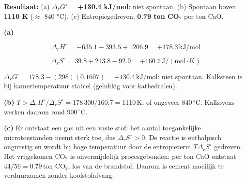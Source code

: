 \begin{oplossing}
\textbf{Resultaat:} (a) \(\Delta_r G^\circ\) = \textbf{+130.4 kJ/mol}: niet spontaan. (b) Spontaan boven \textbf{1110 K} (\ensuremath{\approx{}} 840 °C). (c) Entropiegedreven; \textbf{0.79 ton CO\ensuremath{_{2}}} per ton CaO.

\textbf{(a)}

\[
\Delta_r H^\circ = -635.1 - 393.5 + 1206.9 = +178.3\,\mathrm{kJ/mol}
\]

\[
\Delta_r S^\circ = 39.8 + 213.8 - 92.9 = +160.7\,\mathrm{J/(mol\cdot K)}
\]

\(\Delta_r G^\circ = 178.3 - (298)(0.1607) = +130.4\,\mathrm{kJ/mol}\): niet spontaan. Kalksteen is bij kamertemperatuur stabiel (gelukkig voor kathedralen).

\textbf{(b)} \(T > \Delta_r H^\circ/\Delta_r S^\circ = 178\,300/160.7 = 1110\,\mathrm{K}\), of ongeveer \(840\,^\circ\mathrm{C}\). Kalkovens werken daarom rond \(900\,^\circ\mathrm{C}\).

\textbf{(c)} Er ontstaat een gas uit een vaste stof: het aantal toegankelijke microtoestanden neemt sterk toe, dus \(\Delta_r S^\circ > 0\). De reactie is enthalpisch ongunstig en wordt bij hoge temperatuur door de entropieterm \(T\Delta_r S^\circ\) gedreven. Het vrijgekomen \(\mathrm{CO_2}\) is onvermijdelijk procesgebonden: per ton CaO ontstaat \(44/56 = 0.79\,\mathrm{ton}\) \(\mathrm{CO_2}\), los van de brandstof. Daarom is cement moeilijk te verduurzamen zonder koolstofafvang.
\end{oplossing}

